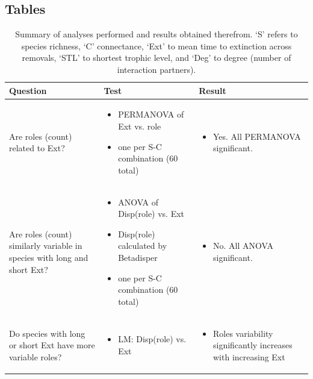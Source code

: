 \documentclass[12pt]{article}
\begin{document}
\begin{landscape}
\section*{Tables}

    \begin{table}[h!]
        \centering
        \footnotesize
        \caption{Summary of analyses performed and results obtained therefrom. `S' refers to species richness, `C' connectance, `Ext' to mean time to extinction across removals, `STL' to shortest trophic level, and `Deg' to degree (number of interaction partners). }
        \label{overview_table}
        \begin{tabular}{m{6cm}|m{7.5cm}|m{8cm}}
        Question & Test & Result \\
        \hline
        Are roles (count) related to Ext? & 
        \begin{itemize}
            \item PERMANOVA of Ext vs. role
            \item one per S-C combination (60 total)
        \end{itemize} 
        & \begin{itemize} \item Yes. All PERMANOVA significant. \end{itemize} \\
        Are roles (count) similarly variable in species with long and short Ext? & 
        \begin{itemize}
            \item ANOVA of Disp(role) vs. Ext
            \item Disp(role) calculated by Betadisper
            \item one per S-C combination (60 total)
        \end{itemize}
        & \begin{itemize} \item No. All ANOVA significant. \end{itemize} \\
        Do species with long or short Ext have more variable roles? & \begin{itemize}
            \item LM: Disp(role) vs. Ext
        \end{itemize} & \begin{itemize} \item Roles variability significantly increases with increasing Ext \end{itemize} \\

\end{tabular}
\end{table}
\end{landscape}
\end{document}
